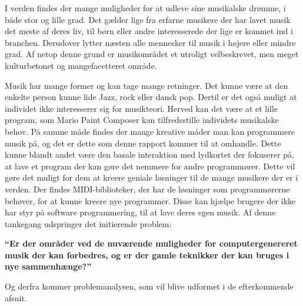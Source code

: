 I verden findes der mange muligheder for at udleve sine musikalske drømme, i både stor og lille grad.
Det gælder lige fra erfarne musikere der har lavet musik det meste af deres liv, til børn eller andre interesserede der lige er kommet ind i branchen.
Derudover lytter næsten alle mennesker til musik i højere eller mindre grad.
Af netop denne grund er musikområdet et utroligt velbeskrevet, men meget kulturbetonet og mangefacetteret område.


Musik har mange former og kan tage mange retninger.
Det kunne være at den enkelte person kunne lide Jazz, rock eller dansk pop.
Dertil er det også muligt at individet ikke interesserer sig for musikteori.
Herved kan det være at et lille program, som Mario Paint Composer kan tilfredsstille individets musikalske behov.
På samme måde findes der mange kreative måder man kan programmere musik på, og det er dette som denne rapport kommer til at omhandle.
Dette kunne blandt andet være den basale interaktion med lydkortet der fokuserer på, at lave et program der kan gøre det nemmere for andre programmører.
Dette vil gøre det muligt for dem at kreere geniale løsninger til de mange musikere der er i verden.
Der findes MIDI-biblioteker, der har de løsninger som programmørerne behøver, for at kunne kreere nye programmer.
Disse kan hjælpe brugere der ikke har styr på software programmering, til at lave deres egen musik.
Af denne tankegang udspringer det initierende problem:



\textbf{“Er der områder ved de nuværende muligheder for computergenereret musik der kan forbedres, og er der gamle teknikker der kan bruges i nye sammenhænge?”}



Og derfra kommer problemanalysen, som vil blive udformet i de efterkommende afsnit.